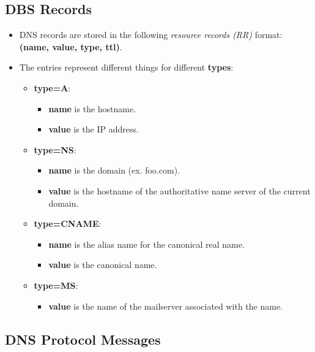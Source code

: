 \documentclass{article}
\begin{document}
\subsection{DBS Records}

\begin{itemize}
\item DNS records are stored in the following {\it resource records (RR)} format: {\bf (name, value, type, ttl)}.
\item The entries represent different things for different {\bf types}:
\begin{itemize}
\item {\bf type=A}:
\begin{itemize}
\item {\bf name} is the hostname.
\item {\bf value} is the IP address.
\end{itemize}
\item {\bf type=NS}:
\begin{itemize}
\item {\bf name} is the domain (ex. foo.com).
\item {\bf value} is the hostname of the authoritative name server of the current domain.
\end{itemize}
\item {\bf type=CNAME}:
\begin{itemize}
\item {\bf name} is the alias name for the canonical real name.
\item {\bf value} is the canonical name.
\end{itemize}
\item {\bf type=MS}:
\begin{itemize}
\item {\bf value} is the name of the mailserver associated with the name.
\end{itemize}
\end{itemize}
\end{itemize}

\subsection{DNS Protocol Messages}
\end{document}
